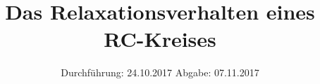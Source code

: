 

\subject{Versuch 353}
\title{Das Relaxationsverhalten eines RC-Kreises}
\date{%
  Durchführung: 24.10.2017
  \hspace{3em}
  Abgabe: 07.11.2017
}



\maketitle
\thispagestyle{empty}
\tableofcontents
\newpage







\printbibliography{}


